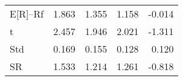 \begin{tabular}{lrrrr}
\toprule
\midrule
E[R]--Rf & 1.863 & 1.355 & 1.158 & -0.014 \\
t & 2.457 & 1.946 & 2.021 & -1.311 \\
Std & 0.169 & 0.155 & 0.128 & 0.120 \\
SR & 1.533 & 1.214 & 1.261 & -0.818 \\
\bottomrule
\end{tabular}
